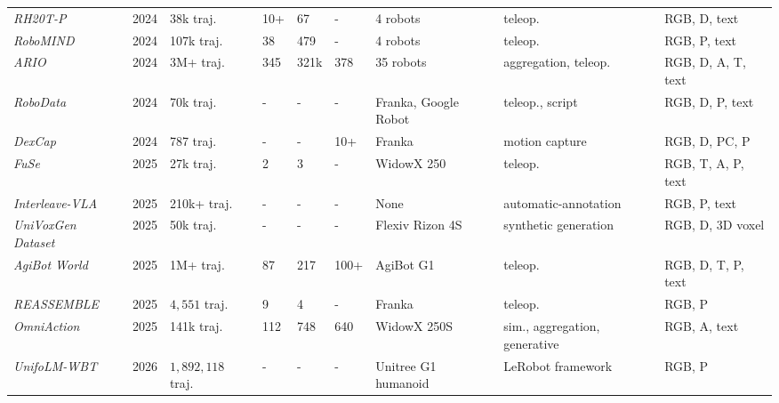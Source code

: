 \begin{table}[!ht]
\begin{tabular}{l p{0.7cm} p{1.8cm} p{1.7cm} p{1.2cm} p{1.2cm} p{1.5cm} p{1.7cm} p{1.5cm}}
    \textit{RH20T-P} \cite{RH20T-P}& 2024 & 38k traj. 
    & 10+ & 67 & - & 4 robots & teleop. & RGB, D, text \\
    
    \textit{RoboMIND} \cite{RoboMIND}& 2024 & 107k traj. 
    & 38 & 479 & - & 4 robots & teleop. & RGB, P, text \\
    
    \textit{ARIO} \cite{ARIO}& 2024 & 3M+ traj. 
    & 345 & 321k &378 & 35 robots & aggregation, teleop. & RGB, D, A, T, text \\

    \textit{RoboData} \cite{RoboData}& 2024 & 70k traj. 
    & - & - & - & Franka, Google Robot & teleop., script & RGB, D, P, text \\
    
    \textit{DexCap} \cite{DexCap}& 2024 & 787 traj. 
    & - & - & 10+ & Franka & motion capture & RGB, D, PC, P \\
    
    \textit{FuSe} \cite{FuSe}& 2025 & 27k traj. 
    & 2 & 3 & - & WidowX 250 & teleop. & RGB, T, A, P, text \\

    \textit{Interleave-VLA} \cite{Interleave-VLA}& 2025 & 210k+ traj. 
    & - & - & - & None & automatic-annotation & RGB, P, text \\

    \textit{UniVoxGen Dataset} \cite{UniVoxGen-Dataset}& 2025 & 50k traj. 
    & - & - & - & Flexiv Rizon 4S & synthetic generation & RGB, D, 3D voxel \\

    \textit{AgiBot World} \cite{AgiBot_World_Colosseo}& 2025 & 1M+ traj. 
    & 87 & 217 & 100+ & AgiBot G1 & teleop. & RGB, D, T, P, text \\

    \textit{REASSEMBLE} \cite{REASSEMBLE}& 2025 & $4,551$ traj. 
    & 9 & 4 & - & Franka & teleop. & RGB, P \\
    
    \textit{OmniAction} \cite{OmniAction}& 2025 & 141k traj. 
    & 112 & 748 & 640 & WidowX 250S & sim., aggregation, generative & RGB, A, text \\

    \textit{UnifoLM-WBT} \cite{UnifoLM-WBT}& 2026 & $1,892,118$ traj. 
    & - & - & - & Unitree G1 humanoid & LeRobot framework & RGB, P \\
    
    \bottomrule
    \end{tabular}
    
    \vspace{-6pt}
\end{table}








